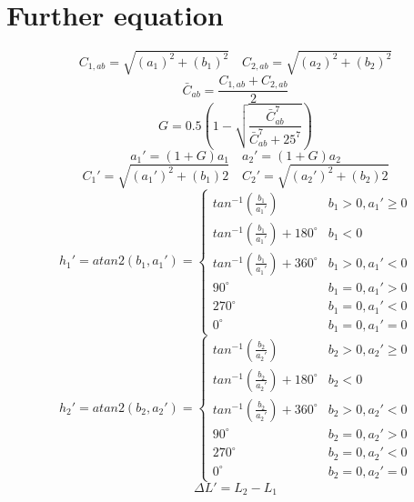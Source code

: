 \appendix
\section{Further equation}
\begin{equation}
C_{1,ab}=\sqrt{(a_{1})^{2}+(b_{1})^{2}} \quad C_{2,ab}=\sqrt{(a_{2})^{2}+(b_{2})^{2}}
\end{equation}
\begin{equation}
\bar{C}_{ab}=\frac{C_{1,ab}+C_{2,ab}}{2}
\end{equation}
\begin{equation}
G = 0.5(1-\sqrt{\frac{\bar{C}_{ab}^{7}}{\bar{C}_{ab}^{7}+25^7}})
\end{equation}
\begin{equation}
a_{1}'=(1+G)a_{1} \quad a_{2}'=(1+G)a_{2} 
\end{equation}
\begin{equation}
C_{1}'=\sqrt{(a_{1}')^{2}+(b_{1})2} \quad C_{2}'=\sqrt{(a_{2}')^{2}+(b_{2})2}
\end{equation}
\begin{equation}
h_{1}' = atan2(b_{1},a_{1}') =
\begin{cases}
tan^{-1}(\frac{b_{1}}{a_{1}'}) & b_{1}>0,a_{1}' \geq 0\\
tan^{-1}(\frac{b_{1}}{a_{1}'})+180^{\circ} & b_{1}<0\\
tan^{-1}(\frac{b_{1}}{a_{1}'})+360^{\circ} & b_{1}>0,a_{1}'<0 \\
90^{\circ} & b_{1}=0,a_{1}'>0\\
270^{\circ} & b_{1}=0,a_{1}'<0\\
0^{\circ} & b_{1}=0,a_{1}'=0
\end{cases}
\end{equation}
\begin{equation}
h_{2}' = atan2(b_{2},a_{2}') =
\begin{cases}
tan^{-1}(\frac{b_{2}}{a_{2}'}) & b_{2}>0,a_{2}' \geq 0\\
tan^{-1}(\frac{b_{2}}{a_{2}'})+180^{\circ} & b_{2}<0\\
tan^{-1}(\frac{b_{2}}{a_{2}'})+360^{\circ} & b_{2}>0,a_{2}'<0 \\
90^{\circ} & b_{2}=0,a_{2}'>0\\
270^{\circ} & b_{2}=0,a_{2}'<0\\
0^{\circ} & b_{2}=0,a_{2}'=0
\end{cases}
\end{equation}
\begin{equation}
\Delta L'=L_{2}-L_{1}
\end{equation}
